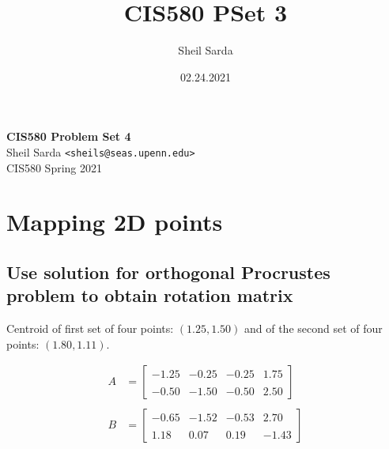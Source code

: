 \documentclass[12pt, oneside]{article}
\title{CIS580 PSet 3}
\author{Sheil Sarda}
\date{02.24.2021}
\begin{document}

\begin{titlepage}
    \begin{flushleft}
        \vspace*{1cm}
        \Huge
        \textbf{CIS580 Problem Set 4\\ }
        \vspace*{0.5cm}
        \normalsize
        Sheil Sarda \verb|<sheils@seas.upenn.edu>| \\
        CIS580 Spring 2021
        \tableofcontents
    \end{flushleft}
\end{titlepage}

\section{Mapping 2D points}

\subsection{Use solution for orthogonal Procrustes problem to obtain rotation 
matrix}

Centroid of first set of four points: $(1.25, 1.50)$ and of the 
second set of four points: $(1.80, 1.11)$.

\begin{align*}
    A    &= 
    \begin{bmatrix} -1.25 & -0.25 & -0.25 & 1.75\\ \\ 
                    -0.50 & -1.50 & -0.50 & 2.50
    \end{bmatrix} \\ \\
    B    &= 
    \begin{bmatrix} -0.65 & -1.52 & -0.53 & 2.70\\ \\ 
                    1.18 &  0.07 &  0.19 & -1.43
    \end{bmatrix} 
\end{align*}
\end{document}

